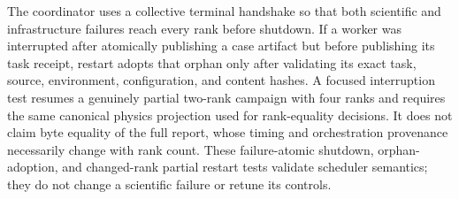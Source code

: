 \documentclass[11pt]{article}
\renewcommand{\_}{\OriginalTextUnderscore\allowbreak}
\begin{document}
The coordinator uses a collective terminal handshake so that both scientific
and infrastructure failures reach every rank before shutdown. If a worker
was interrupted after atomically publishing a case artifact but before
publishing its task receipt, restart adopts that orphan only after validating
its exact task, source, environment, configuration, and content hashes. A
focused interruption test resumes a genuinely partial two-rank campaign with
four ranks and requires the same canonical physics projection used for
rank-equality decisions. It does not claim byte equality of the full report,
whose timing and orchestration provenance necessarily change with rank count.
These failure-atomic shutdown, orphan-adoption, and changed-rank partial
restart tests validate scheduler semantics; they do not change a scientific
failure or retune its controls.
\end{document}
